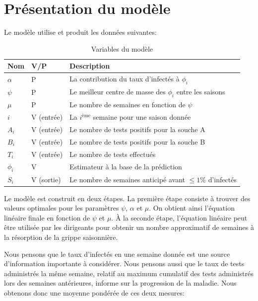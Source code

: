 \documentclass[12pt]{article}
\begin{document}
\section{Pr\'esentation du mod\`ele}
Le mod\`ele utilise et produit les donn\'ees suivantes:
\begin{table}[h]
    \centering
    \begin{tabular}{|l|l|l|}\hline
        Nom &V/P &Description\\\hline
        $\alpha$ &P &La contribution du taux d'infect\'es \`a $\phi_i$\\\hline
        $\psi$ &P &Le meilleur centre de masse des $\phi_i$ entre les saisons\\\hline
        $\mu$ &P &Le nombre de semaines en fonction de $\psi$\\\hline
        $i$ &V (entr\'ee) &La $i^{\text{\`eme}}$ semaine pour une saison donn\'ee\\\hline
        $A_i$ &V (entr\'ee) &Le nombre de tests positifs pour la souche A\\\hline
        $B_i$ &V (entr\'ee) &Le nombre de tests positifs pour la souche B\\\hline
        $T_i$ &V (entr\'ee) &Le nombre de tests effectu\'es\\\hline
        $\phi_i$ &V &Estimateur \`a la base de la pr\'ediction\\\hline
        $S_i$ &V (sortie) &Le nombre de semaines anticip\'e avant $\leq 1\%$ d'infect\'es\\\hline
    \end{tabular}
    \caption{Variables du mod\`ele}
\end{table}

Le mod\`ele est construit en deux \'etapes. La premi\`ere \'etape consiste \`a trouver des valeurs
optimales pour les param\`etres $\psi$, $\alpha$ et $\mu$.  On obtient ainsi l'\'equation lin\'eaire
finale en fonction de $\psi$ et $\mu$. \`A la seconde \'etape, l'\'equation lin\'eaire peut \^etre
utilis\'ee par les dirigeants pour obtenir un nombre approximatif de semaines \`a la r\'esorption de
la grippe saisonni\`ere.

Nous pensons que le taux d'infect\'es en une semaine donn\'ee est une source d'information
importante \`a consid\'erer. Nous pensons aussi que le taux de tests administr\'es la m\^eme
semaine, relatif au maximum cumulatif des tests administr\'es lors des semaines ant\'erieures,
informe sur la progression de la maladie.  Nous obtenons donc une moyenne pond\'er\'ee de ces deux
mesures:
\end{document}
